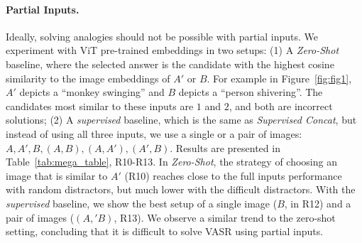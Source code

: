 \documentclass[letterpaper]{article} \usepackage{aaai23}  \usepackage{times}  \usepackage{helvet}  \usepackage{courier}  \usepackage[hyphens]{url}  \usepackage{graphicx} \urlstyle{rm} \def\UrlFont{\rm}  \usepackage{natbib}  \usepackage{caption} \frenchspacing  \setlength{\pdfpagewidth}{8.5in}  \setlength{\pdfpageheight}{11in}  \usepackage{algorithm}
\newcommand{\trainedconcat}[0]{\emph{Supervised Concat}}
\begin{document}
\begin{table}[!t]
\caption{Results per analogy types of humans and models baselines. The class with the highest/lowest accuracy for each model is in bold. Data Percentage is the proportion of each class from the \emph{gold} test. Objects Proportion is the mean object size divided by full image size.}
\label{tab:res_per_analogy_types}
\centering
{}\end{table}

\paragraph{Partial Inputs.} Ideally, solving analogies should not be possible with partial inputs. We experiment with ViT pre-trained embeddings in two setups: (1) A \emph{Zero-Shot} baseline, where the selected answer is the candidate with the highest cosine similarity to the image embeddings of $A'$ or $B$. For example in Figure~\ref{fig:fig1}, $A'$ depicts a ``monkey swinging'' and $B$ depicts a ``person shivering''. The candidates most similar to these inputs are $1$ and $2$, and both are incorrect solutions; (2) A \emph{supervised} baseline, which is the same as \trainedconcat{}, but instead of using all three inputs, we use a single or a pair of images: $A, A', B, (A,B), (A,A'), (A',B)$.
Results are presented in Table~\ref{tab:mega_table}, R10-R13. In \emph{Zero-Shot}, the strategy of choosing an image that is similar to $A'$ (R10) reaches close to the full inputs performance with random distractors, but much lower with the difficult distractors. With the \emph{supervised} baseline, we show the best setup of a single image ($B$, in R12) and a pair of images ($(A,'B)$, R13). We observe a similar trend to the zero-shot setting, concluding that it is difficult to solve VASR using partial inputs.
\end{document}
